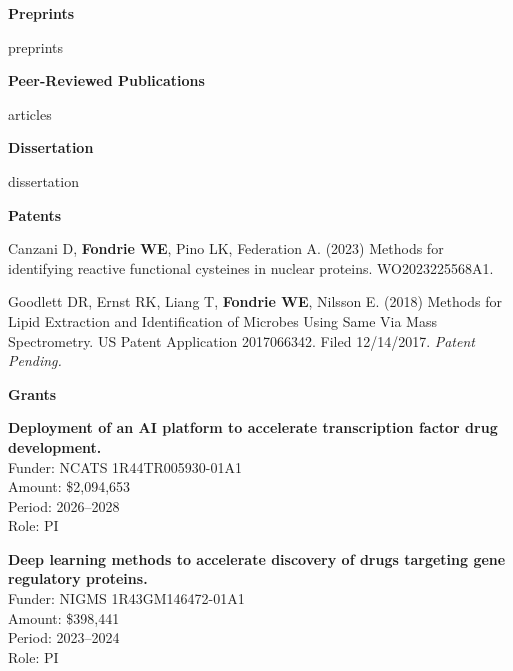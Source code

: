 \documentclass[11pt]{article}
\newcommand{\mysection}[1]{\vspace{1ex} \textbf{\large \textsf{#1} \quad \hrulefill}}
\begin{document}
\newpage
{%
\mysection{Preprints}
\begin{etaremune}
{{ preprints }}
\end{etaremune}
{%

\mysection{Peer-Reviewed Publications}

\begin{etaremune}
{{ articles }}
\end{etaremune}

\mysection{Dissertation}
\begin{etaremune}
{{ dissertation }}
\end{etaremune}

\mysection{Patents}
\begin{etaremune}
  \item Canzani D, \textbf{Fondrie WE}, Pino LK, Federation A. (2023) Methods for identifying reactive functional cysteines in nuclear proteins. WO2023225568A1.

  \item Goodlett DR, Ernst RK, Liang T, \textbf{Fondrie WE}, Nilsson E. (2018)
  Methods for Lipid Extraction and Identification of Microbes Using Same Via
  Mass Spectrometry. US Patent Application 2017066342. Filed 12/14/2017. {\it
    Patent Pending.}
\end{etaremune}

\mysection{Grants}
\begin{etaremune}
  \item \textbf{Deployment of an AI platform to accelerate transcription factor drug development.} \\
  Funder: NCATS 1R44TR005930-01A1 \\
  Amount: \$2,094,653\\
  Period: 2026--2028 \\
  Role: PI \\

  \item \textbf{Deep learning methods to accelerate discovery of drugs targeting gene regulatory proteins.} \\
  Funder: NIGMS 1R43GM146472-01A1 \\
  Amount: \$398,441\\
  Period: 2023--2024 \\
  Role: PI \\


\end{etaremune}}}
\end{document}
